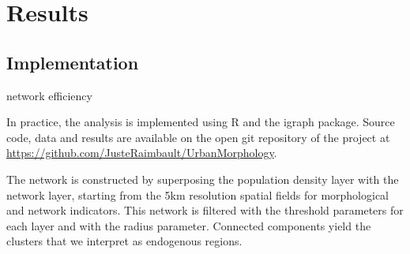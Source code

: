 \documentclass{jimis-en}
\begin{document}
\section{Results}

\subsection{Implementation}






\cite{banos2012towards} network efficiency



In practice, the analysis is implemented using R and the igraph package. Source code, data and results are available on the open git repository of the project at \url{https://github.com/JusteRaimbault/UrbanMorphology}.



The network is constructed by superposing the population density layer with the network layer, starting from the 5km resolution spatial fields for morphological and network indicators. This network is filtered with the threshold parameters for each layer and with the radius parameter. Connected components yield the clusters that we interpret as endogenous regions.
\end{document}
